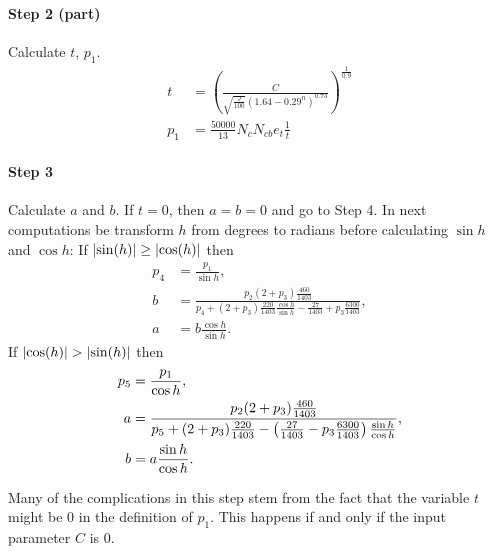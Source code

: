 \documentclass[twocolumn]{scrartcl}
\DeclarePairedDelimiter\abs{\lvert}{\rvert}%
\begin{document}
\paragraph{Step 2 (part)}{Calculate $t$, $p_1$.
\begin{align*}
  t &= {\left(\frac{C}{\sqrt{\frac{J}{100}} {(1.64 - 0.29^n)}^{0.73}}\right)}^\frac{1}{0.9}\\
  p_1 &= \frac{50000}{13} N_c N_{cb} e_t \frac{1}{t}
\end{align*}
}

\paragraph{Step 3}{Calculate $a$ and $b$.
If $t=0$, then $a=b=0$ and go to Step 4.
In next computations be transform $h$ from degrees to radians
before calculating $\sin h$ and $\cos h$:
If $\abs{\sin(h)} \ge \abs{\cos(h)}$ then
\begin{align*}
  p_4 &= \frac{p_1}{\sin h},\\
  b &= \frac{p_2 (2+p_3) \frac{460}{1403}}{p_4 + (2+p_3) \frac{220}{1403} \frac{\cos h}{\sin h} - \frac{27}{1403} + p_3 \frac{6300}{1403}},\\
  a &= b \frac{\cos h}{\sin h}.
\end{align*}
If $\abs{\cos(h)} > \abs{\sin(h)}$ then
\begin{align*}
  p_5 &= \frac{p_1}{\cos h},\\
  a &= \frac{p_2 (2+p_3) \frac{460}{1403}}{%
    p_5
    + (2+p_3) \frac{220}{1403} -
    \left(\frac{27}{1403}  - p_3 \frac{6300}{1403}\right) \frac{\sin h}{\cos h}
  },\\
  b &= a \frac{\sin h}{\cos h}.
\end{align*}
}

Many of the complications in this step stem from the fact that the variable $t$
might be $0$ in the definition of $p_1$. This happens if and only if the input
parameter $C$ is $0$.
\end{document}
